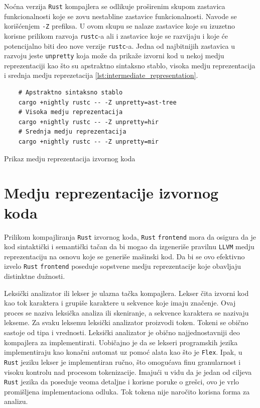 \documentclass[11pt]{article}
\begin{document}
Noćna verzija \verb|Rust| kompajlera se odlikuje proširenim skupom zastavica funkcionalnosti koje se zovu 
nestabline zastavice funkcionalnosti. Navode se korišćenjem \verb|-Z| prefiksa. U ovom skupu se nalaze 
zastavice koje su izuzetno korisne prilikom razvoja \verb|rustc|-a ali i zastavice koje se razvijaju
i koje će potencijalno biti deo nove verzije \verb|rustc|-a. Jedna od najbitnijih zastavica u razvoju 
jeste \verb|unpretty| koja može da prikaže izvorni kod u nekoj medju reprezentaciji kao što su
apstraktno sintaksno stablo, visoka medju reprezentacija i srednja medju reprezetacija \ref{lst:intermediate_representation}.

\begin{listing}[H]
\begin{verbatim}
    # Apstraktno sintaksno stablo 
    cargo +nightly rustc -- -Z unpretty=ast-tree
    # Visoka medju reprezentacija
    cargo +nightly rustc -- -Z unpretty=hir
    # Srednja medju reprezentacija
    cargo +nightly rustc -- -Z unpretty=mir
\end{verbatim}
\caption{Prikaz medju reprezentacija izvornog koda}
\label{lst:intermediate_representation}
\end{listing}


\newpage



\section{Medju reprezentacije izvornog koda}

Prilikom kompajliranja \verb|Rust| izvornog koda, \verb|Rust| \verb|frontend| mora da osigura da je 
kod sintaktički i semantički tačan da bi mogao da izgeneriše pravilnu \verb|LLVM| medju reprezentaciju 
na osnovu koje se generiše mašinski kod. Da bi se ovo efektivno izvelo \verb|Rust| \verb|frontend| poseduje 
sopstvene medju reprezentacije koje obavljaju distinktne dužnosti. 

Leksički analizator ili lekser je ulazna tačka kompajlera. Lekser čita izvorni kod kao tok karaktera i grupiše karaktere 
u sekvence koje imaju značenje. Ovaj proces se naziva leksička analiza ili skeniranje, a sekvence karaktera se nazivaju lekseme. 
Za svaku leksemu leksički analizator proizvodi token. Tokeni se obično sastoje od tipa i vrednosti.
Leksički analizator je obično najjednostavniji deo kompajlera za implementirati. 
Uobičajno je da se lekseri programskih jezika implementiraju kao konačni automat uz pomoć alata kao što 
je \verb|Flex|. Ipak, u \verb|Rust| jeziku lekser je implementiran ručno, što omogućava finu granularnost 
i visoku kontrolu nad procesom tokenizacije. Imajući u vidu da je jedan od ciljeva \verb|Rust| jezika 
da poseduje veoma detaljne i korisne poruke o grešci, ovo je vrlo promišljena implementaciona odluka. 
Tok tokena nije naročito korisna forma za analizu.
\end{document}
